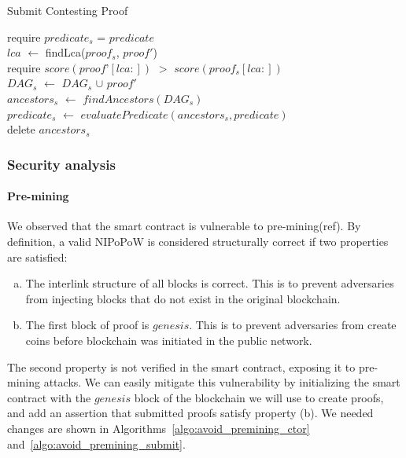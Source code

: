 \begin{algorithm}
    \caption{Submit Contesting Proof}
    \label{algo:contest_old}
    require $predicate_{s}$ = $predicate$\\
    $lca$ $\leftarrow$ findLca($proof_{s}$, $proof'$)\\
    require $score(proof’[lca:])$ $>$ $score(proof_{s}[lca:])$ \\
    $DAG_{s}$ $\leftarrow$ $DAG_{s}$ $\cup$ $proof'$\\
    $ancestors_{s}$ $\leftarrow$ $findAncestors(DAG_{s})$\\
    $predicate_{s}$ $\leftarrow$ $evaluatePredicate(ancestors_{s},
    predicate)$\\
    delete $ancestors_{s}$\\
\end{algorithm}

\subsubsection{Security analysis}

\paragraph{Pre-mining}
We observed that the smart contract is vulnerable to pre-mining(ref). By
definition, a valid NIPoPoW is considered structurally correct if two
properties are satisfied:

\begin{enumerate}[(a)]

\item The interlink structure of all blocks is correct. This is to prevent
    adversaries from injecting blocks that do not exist in the original
    blockchain.

\item The first block of proof is $genesis$. This is to prevent adversaries
    from create coins before blockchain was initiated in the public network.

\end{enumerate}

The second property is not verified in the smart contract, exposing it to
pre-mining attacks. We can easily mitigate this vulnerability by initializing
the smart contract with the $genesis$ block of the blockchain we will use to
create proofs, and add an assertion that submitted proofs satisfy property (b).
We needed changes are shown in Algorithms~\ref{algo:avoid_premining_ctor}
and~\ref{algo:avoid_premining_submit}.

